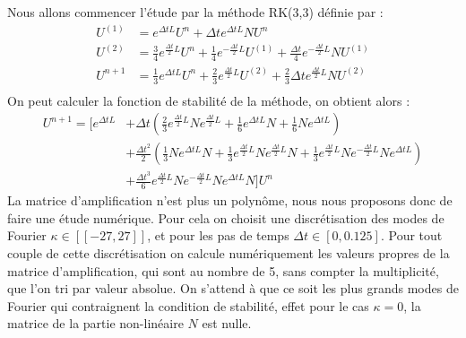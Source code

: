 Nous allons commencer l'étude par la méthode RK(3,3) définie par :
$$
  \begin{aligned}
    U^{(1)} &= e^{\Delta tL}U^n + \Delta te^{\Delta tL}NU^n \\
    U^{(2)} &= \frac{3}{4}e^{\frac{\Delta t}{2}L}U^n + \frac{1}{4}e^{-\frac{\Delta t}{2}L}U^{(1)} + \frac{\Delta t}{4}e^{-\frac{\Delta t}{2}L}NU^{(1)} \\
    U^{n+1} &= \frac{1}{3}e^{\Delta tL}U^n + \frac{2}{3}e^{\frac{\Delta t}{2}L}U^{(2)} + \frac{2}{3}\Delta te^{\frac{\Delta t}{2}L}NU^{(2)} \\
  \end{aligned}
$$
On peut calculer la fonction de stabilité de la méthode, on obtient alors :
$$
  \begin{aligned}
    U^{n+1} = \Big[ e^{\Delta tL} &+ \Delta t\left(\frac{2}{3}e^{\frac{\Delta t}{2}L}Ne^{\frac{\Delta t}{2}L}+\frac{1}{6}e^{\Delta tL}N + \frac{1}{6}Ne^{\Delta tL}\right) \\
    & + \frac{\Delta t^2}{2}\left(\frac{1}{3}Ne^{\Delta tL}N + \frac{1}{3}e^{\frac{\Delta t}{2}L}Ne^{\frac{\Delta t}{2}L}N + \frac{1}{3} e^{\frac{\Delta t}{2}L}Ne^{-\frac{\Delta t}{2}L}Ne^{\Delta tL} \right) \\
    & + \frac{\Delta t^3}{6}e^{\frac{\Delta t}{2}L}Ne^{-\frac{\Delta t}{2}L}Ne^{\Delta tL}N \Big]U^n
  \end{aligned}
$$
La matrice d'amplification n'est plus un polynôme, nous nous proposons donc de faire une étude numérique. Pour cela on choisit une discrétisation des modes de Fourier $\kappa\in[\![-27,27]\!]$, et pour les pas de temps $\Delta t\in[0,0.125]$. Pour tout couple de cette discrétisation on calcule numériquement les valeurs propres de la matrice d'amplification, qui sont au nombre de 5, sans compter la multiplicité, que l'on tri par valeur absolue. On s'attend à que ce soit les plus grands modes de Fourier qui contraignent la condition de stabilité, effet pour le cas $\kappa=0$, la matrice de la partie non-linéaire $N$ est nulle.

